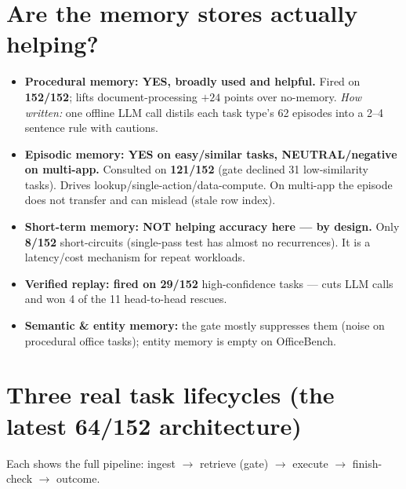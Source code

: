 \documentclass[11pt]{article}
\begin{document}
\section{Are the memory stores actually helping?}
\begin{itemize}[leftmargin=1.4em,itemsep=2pt]
\item \textbf{Procedural memory: YES, broadly used and helpful.} Fired on \textbf{152/152}; lifts
document-processing $+24$ points over no-memory. \emph{How written:} one offline LLM call distils each
task type's 62 episodes into a 2--4 sentence rule with cautions.
\item \textbf{Episodic memory: YES on easy/similar tasks, NEUTRAL/negative on multi-app.} Consulted on
\textbf{121/152} (gate declined 31 low-similarity tasks). Drives lookup/single-action/data-compute. On
multi-app the episode does not transfer and can mislead (stale row index).
\item \textbf{Short-term memory: NOT helping accuracy here --- by design.} Only \textbf{8/152}
short-circuits (single-pass test has almost no recurrences). It is a latency/cost mechanism for repeat
workloads.
\item \textbf{Verified replay: fired on 29/152} high-confidence tasks --- cuts LLM calls and won 4 of the
11 head-to-head rescues.
\item \textbf{Semantic \& entity memory:} the gate mostly suppresses them (noise on procedural office
tasks); entity memory is empty on OfficeBench.
\end{itemize}

\section{Three real task lifecycles (the latest 64/152 architecture)}
Each shows the full pipeline: ingest $\to$ retrieve (gate) $\to$ execute $\to$ finish-check $\to$ outcome.
\end{document}
